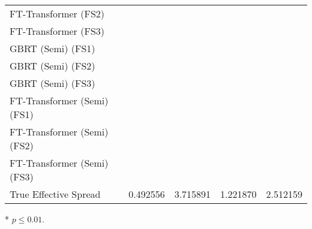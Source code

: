 \begin{threeparttable}
\begin{tabular}{@{}lSSSS@{}}
        FT-Transformer (FS2)                 &                                              & \tnote{*}                                     &          & \tnote{*}       \\
        FT-Transformer (FS3)                 &                                              & \tnote{*}                                     &          & \tnote{*}       \\ \midrule
        \gls{GBRT} (Semi) (FS1)              &                                              & \tnote{*}                                     &          & \tnote{*}       \\
        \gls{GBRT} (Semi) (FS2)              &                                              & \tnote{*}                                     &          & \tnote{*}       \\
        \gls{GBRT} (Semi) (FS3)              &                                              & \tnote{*}                                     &          & \tnote{*}       \\
        FT-Transformer (Semi) (FS1)          &                                              & \tnote{*}                                     &          & \tnote{*}       \\
        FT-Transformer (Semi) (FS2)          &                                              & \tnote{*}                                     &          & \tnote{*}       \\
        FT-Transformer (Semi) (FS3)          &                                              & \tnote{*}                                     &          & \tnote{*}       \\ \midrule
        True Effective Spread                & 0.492556                                     & 3.715891                                      & 1.221870 & 2.512159        \\ \bottomrule
    \end{tabular}
    \begin{tablenotes}\footnotesize
        \item[*] $p \leq 0.01$.
    \end{tablenotes}
\end{threeparttable}